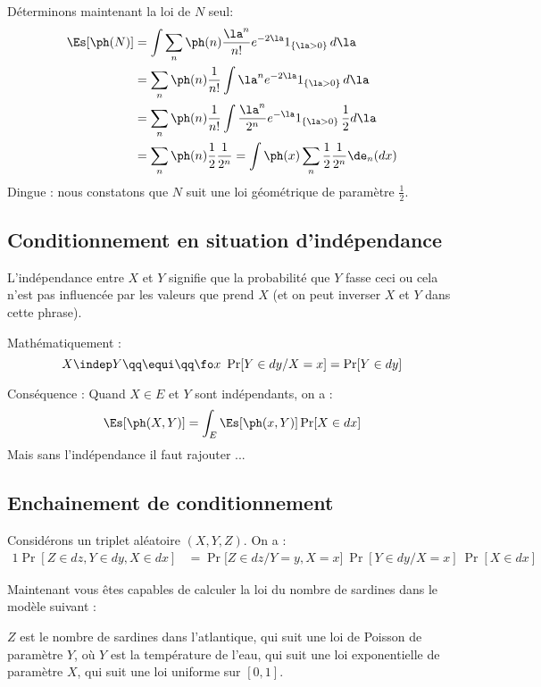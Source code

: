 \documentclass{article}
\begin{document}
Déterminons maintenant la loi de $N$ seul: 
\begin{alignat*}{1}
\Es[\ph(N )]
& = \int  \sum_n   \ph(   n  )      \frac  {\la^n}{n !}       e^{- 2\la } 1_{\{\la >0\}}\, d\la    \\ 
& =  \sum_n   \ph(  n  )  \frac 1   {n !}    \int       {\la^n}       e^{- 2\la } 1_{\{ \la >0\}}\, d\la    \\ 
& =  \sum_n   \ph(  n  )  \frac 1   {n !}    \int       \frac {\la^n}{2^n}       e^{-\la } 1_{\{ \la >0\}}\,  \frac 1 2 d\la    \\ 
& =  \sum_n   \ph(  n  )  \frac 1   {2}          \frac {1}{2^n}      = \int\ph(x) \sum_n \frac 12 \frac 1 {2^n} \de_n(dx)    
\end{alignat*}
Dingue : nous constatons que $N$ suit  une loi géométrique de paramètre $\frac 12$. 




\subsection{Conditionnement en situation d'indépendance}


 L'indépendance entre $X$ et $Y$   signifie  que la probabilité  que  $Y$ fasse ceci ou cela  n'est pas influencée par les valeurs que prend $X$ (et on peut inverser $X$ et $ Y$ dans cette phrase). 
 
Mathématiquement : 
$$
X\indep Y \qq  \equi \qq   \fo x \ \Pr[Y\in dy / X=x ]  = \Pr[Y\in dy]
$$

Conséquence : Quand $X\in E$ et $Y$ sont indépendants, on a :
$$
\Es[\ph(X,Y)] = \int_E \Es[\ph(x,Y)]  \Pr[X\in dx] 
$$
Mais sans l'indépendance il faut rajouter ...


\subsection{Enchainement de conditionnement}

Considérons un triplet aléatoire $(X,Y,Z)$. On a : 
\begin{alignat*}{1}
\Pr[ Z  \in dz  ,Y \in dy   , X\in dx  ] &= \Pr  \Big[ Z \in dz  \Big /   Y = y, X=x    \Big ] \    \Pr[Y\in dy \Big / X=x ]       \  \Pr[X\in dx ] 
\end{alignat*}



Maintenant vous êtes capables de calculer la loi du nombre de sardines dans le modèle suivant : 

$Z$ est le nombre de sardines dans l'atlantique, qui suit une loi de Poisson de paramètre $Y$, où $Y$ est la température de l'eau, qui suit une loi exponentielle de paramètre $X$, qui suit une loi uniforme sur $[0,1]$. 
\end{document}
